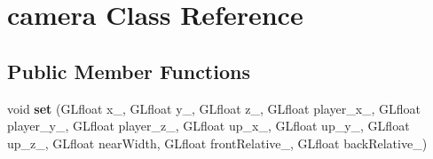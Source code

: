 \hypertarget{classcamera}{\section{camera Class Reference}
\label{classcamera}
}
\subsection*{Public Member Functions}
\begin{DoxyCompactItemize}
\item 
\hypertarget{classcamera_a0bbb4f4c522057e782b1110b52ba4d76}{void {\bfseries set} (G\+Lfloat x\+\_\+, G\+Lfloat y\+\_\+, G\+Lfloat z\+\_\+, G\+Lfloat player\+\_\+x\+\_\+, G\+Lfloat player\+\_\+y\+\_\+, G\+Lfloat player\+\_\+z\+\_\+, G\+Lfloat up\+\_\+x\+\_\+, G\+Lfloat up\+\_\+y\+\_\+, G\+Lfloat up\+\_\+z\+\_\+, G\+Lfloat near\+Width, G\+Lfloat front\+Relative\+\_\+, G\+Lfloat back\+Relative\+\_\+)}\label{classcamera_a0bbb4f4c522057e782b1110b52ba4d76}

\end{DoxyCompactItemize}
